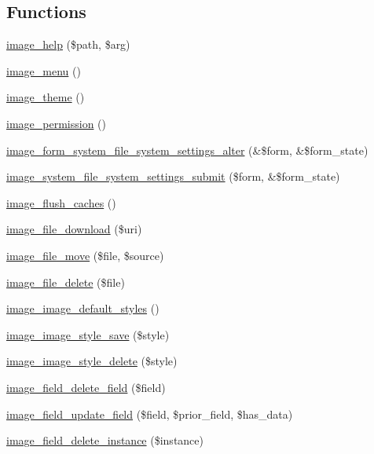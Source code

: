 \subsection*{Functions}
\begin{DoxyCompactItemize}
\item 
\hyperlink{image_8module_a777780a89a7149f7ee61107cc6ec4d98}{image\_\-help} (\$path, \$arg)
\item 
\hyperlink{image_8module_a6307beafb83fb2959c3db239516a9515}{image\_\-menu} ()
\item 
\hyperlink{image_8module_a2a6282083e95717d02ac5f79a194f3bb}{image\_\-theme} ()
\item 
\hyperlink{image_8module_afa11fbedc7ee323dcaa0a52b4ffab623}{image\_\-permission} ()
\item 
\hyperlink{image_8module_adac7f313632df6ce2a34f3cadb75130c}{image\_\-form\_\-system\_\-file\_\-system\_\-settings\_\-alter} (\&\$form, \&\$form\_\-state)
\item 
\hyperlink{image_8module_a440845d7f8654b992f5be1ed61dc7892}{image\_\-system\_\-file\_\-system\_\-settings\_\-submit} (\$form, \&\$form\_\-state)
\item 
\hyperlink{image_8module_a5c9f5b16187ee7050c9f47ffbe204a9b}{image\_\-flush\_\-caches} ()
\item 
\hyperlink{image_8module_a7b239d6ba682f11002687acf636474ec}{image\_\-file\_\-download} (\$uri)
\item 
\hyperlink{image_8module_a27cd817c67a0dea086228c8466ffe213}{image\_\-file\_\-move} (\$file, \$source)
\item 
\hyperlink{image_8module_a3e93edb08d958010616bc0d594558470}{image\_\-file\_\-delete} (\$file)
\item 
\hyperlink{image_8module_ac412aad2549572b4f2dae20d2dbd89ae}{image\_\-image\_\-default\_\-styles} ()
\item 
\hyperlink{image_8module_afe509faa7e910702e9f9e685b7caee54}{image\_\-image\_\-style\_\-save} (\$style)
\item 
\hyperlink{image_8module_a919467cd4f77608c63a9ada825782c66}{image\_\-image\_\-style\_\-delete} (\$style)
\item 
\hyperlink{image_8module_a61fe19440569b6eb7fd3a61f34e4ebfd}{image\_\-field\_\-delete\_\-field} (\$field)
\item 
\hyperlink{image_8module_ae1d89a3e614972588adf70b46109571a}{image\_\-field\_\-update\_\-field} (\$field, \$prior\_\-field, \$has\_\-data)
\item 
\hyperlink{image_8module_a0e5f193a0ecbe7dac74a86f0f7ea5f8b}{image\_\-field\_\-delete\_\-instance} (\$instance)

\end{DoxyCompactItemize}
